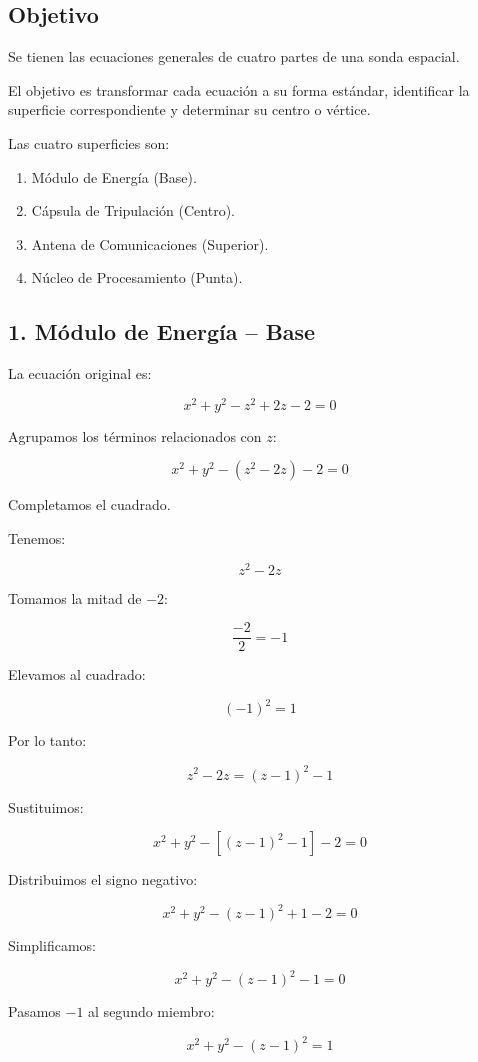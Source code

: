\documentclass[12pt,a4paper]{article}
\begin{document}
\subsection{Objetivo}

Se tienen las ecuaciones generales de cuatro partes de una sonda
espacial.

El objetivo es transformar cada ecuación a su forma estándar,
identificar la superficie correspondiente y determinar su centro
o vértice.

Las cuatro superficies son:

\begin{enumerate}
    \item Módulo de Energía (Base).
    \item Cápsula de Tripulación (Centro).
    \item Antena de Comunicaciones (Superior).
    \item Núcleo de Procesamiento (Punta).
\end{enumerate}

\subsection{1. Módulo de Energía -- Base}

La ecuación original es:

\[x^2+y^2-z^2+2z-2=0\]

Agrupamos los términos relacionados con $z$:

\[x^2+y^2-(z^2-2z)-2=0\]

Completamos el cuadrado.

Tenemos:

\[z^2-2z\]

Tomamos la mitad de $-2$:

\[\frac{-2}{2}=-1\]

Elevamos al cuadrado:

\[(-1)^2=1\]

Por lo tanto:

\[z^2-2z=(z-1)^2-1\]

Sustituimos:

\[x^2+y^2-\left[(z-1)^2-1\right]-2=0\]

Distribuimos el signo negativo:

\[x^2+y^2-(z-1)^2+1-2=0\]

Simplificamos:

\[x^2+y^2-(z-1)^2-1=0\]

Pasamos $-1$ al segundo miembro:

\[\boxed{x^2+y^2-(z-1)^2=1}\]
\end{document}
